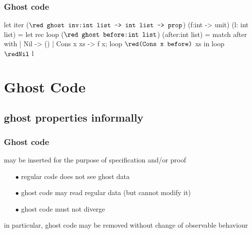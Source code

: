 \documentclass[xcolor=dvipsnames]{beamer}
\begin{document}
\begin{frame}[fragile]
\frametitle{Ghost code}
\hspace*{-1em}
\begin{whycode}
let iter (${\texttt{{\red ghost inv}:int list -> int list -> prop}}$) 
(f:int -> unit) (l: int list)
= let rec loop (${ \texttt{{\red ghost before}:int list}}$) (after:int list)
  = match after with
     | Nil       -> ()
     | Cons x xs -> f x; loop ${\red \texttt{(Cons x before)}}$ xs
  in loop ${\red\texttt{Nil}}$ l
\end{whycode}
\end{frame}

\section*{Ghost Code}

\subsection*{ghost properties informally}

\begin{frame}
\frametitle{{Ghost code}}
	may be inserted for the purpose of specification and/or proof \\[1em]
	\pause	
	\begin{itemize}
	\item[\red $\bullet$] regular code does not see ghost data
	\item[\red $\bullet$] ghost code may read regular data (but cannot modify it)\\[1em]
	\item[\red $\bullet$] ghost code must not diverge
	\end{itemize}
in particular, ghost code may be removed without change of observable behaviour
\end{frame}
\end{document}
